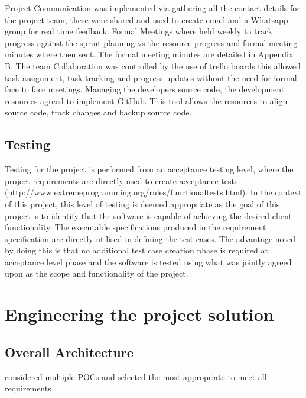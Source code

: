 \documentclass[12pt]{witseiepaper}
\begin{document}
Project Communication was implemented via gathering all the contact details for the project team, these were shared and used to create email and a Whatsapp group for real time feedback. Formal Meetings where held weekly to track progress against the sprint planning vs the resource progress and formal meeting minutes where then sent. The formal meeting minutes are detailed in Appendix B. The team Collaboration was controlled by the use of trello boards \cite{Trello} this allowed task assignment, task tracking and progress updates without the need for formal face to face meetings. Managing the developers source code, the development resources agreed to implement GitHub.\cite{GitHubRef} This tool allows the resources to align source code, track changes and backup source code. 

\subsection{Testing}
Testing for the project is performed from an acceptance testing level, where the project requirements are directly used to create acceptance tests (http://www.extremeprogramming.org/rules/functionaltests.html). In the context of this project, this level of testing is deemed appropriate as the goal of this project is to identify that the software is capable of achieving the desired client functionality.
The executable specifications produced in the requirement specification are directly utilised in defining the test cases. The advantage noted by doing this is that no additional test case creation phase is required at acceptance level phase and the software is tested using what was jointly agreed upon as the scope and functionality of the project.





\section{Engineering the project solution}
\subsection{Overall Architecture}

considered multiple POCs and selected the most appropriate to meet all requirements
\end{document}
